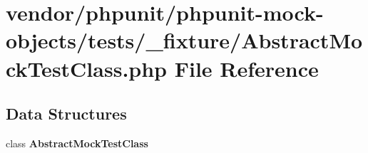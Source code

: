 \section{vendor/phpunit/phpunit-\/mock-\/objects/tests/\+\_\+fixture/\+Abstract\+Mock\+Test\+Class.php File Reference}
\label{_abstract_mock_test_class_8php}
\subsection*{Data Structures}
\begin{DoxyCompactItemize}
\item 
class {\bf Abstract\+Mock\+Test\+Class}
\end{DoxyCompactItemize}
